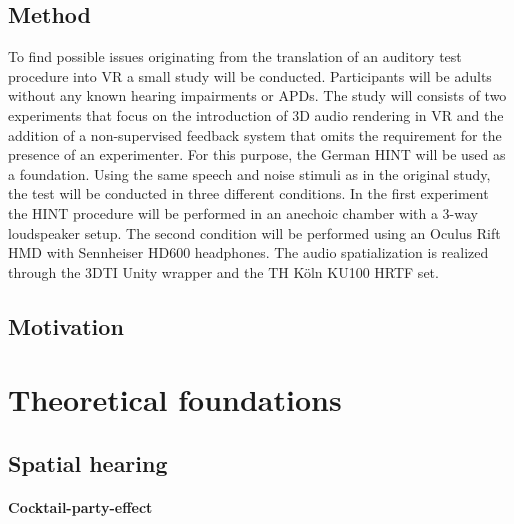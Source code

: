\documentclass[a4paper,11pt]{article}%
\renewcommand{\\}{\vspace*{0.5\baselineskip} \newline}
\begin{document}
\subsection{Method}
To find possible issues originating from the translation of an auditory test procedure into \ac{VR} a small study will be conducted. Participants will be adults without any known hearing impairments or \ac{APD}s. The study will consists of two experiments that focus on the introduction of 3D audio rendering in \ac{VR} and the addition of a non-supervised feedback system that omits the requirement for the presence of an experimenter.
\newline
\newline
For this purpose, the German \ac{HINT} will be used as a foundation. Using the same speech and noise stimuli as in the original study, the test will be conducted in three different conditions. In the first experiment the \ac{HINT} procedure will be performed in an anechoic chamber with a 3-way loudspeaker setup. The second condition will be performed using an Oculus Rift \ac{HMD} with Sennheiser HD600 headphones. The audio spatialization is realized through the \ac{3DTI} Unity wrapper and the TH Köln KU100 \ac{HRTF} set.


\subsection{Motivation}

\section{Theoretical foundations}

\subsection{Spatial hearing}

\paragraph{Cocktail-party-effect}
\end{document}
